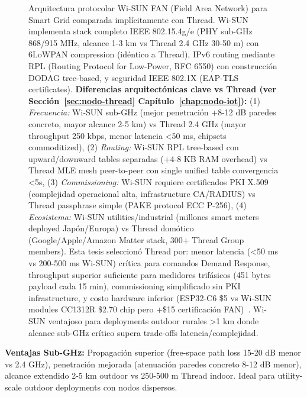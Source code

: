 \begin{figure}[H]
\centering
\caption{Arquitectura protocolar Wi-SUN FAN (Field Area Network) para Smart Grid comparada implícitamente con Thread. Wi-SUN implementa stack completo IEEE 802.15.4g/e (PHY sub-GHz 868/915 MHz, alcance 1-3 km vs Thread 2.4 GHz 30-50 m) con 6LoWPAN compression (idéntico a Thread), IPv6 routing mediante RPL (Routing Protocol for Low-Power, RFC 6550) con construcción DODAG tree-based, y seguridad IEEE 802.1X (EAP-TLS certificates). \textbf{Diferencias arquitectónicas clave vs Thread (ver Sección~\ref{sec:nodo-thread} Capítulo~\ref{chap:nodo-iot}):} (1) \textit{Frecuencia:} Wi-SUN sub-GHz (mejor penetración +8-12 dB paredes concreto, mayor alcance 2-5 km) vs Thread 2.4 GHz (mayor throughput 250 kbps, menor latencia <50 ms, chipsets commoditized), (2) \textit{Routing:} Wi-SUN RPL tree-based con upward/downward tables separadas (+4-8 KB RAM overhead) vs Thread MLE mesh peer-to-peer con single unified table convergencia <5s, (3) \textit{Commissioning:} Wi-SUN requiere certificados PKI X.509 (complejidad operacional alta, infrastructure CA/RADIUS) vs Thread passphrase simple (PAKE protocol ECC P-256), (4) \textit{Ecosistema:} Wi-SUN utilities/industrial (millones smart meters deployed Japón/Europa) vs Thread domótico (Google/Apple/Amazon Matter stack, 300+ Thread Group members). Esta tesis seleccionó Thread por: menor latencia (<50 ms vs 200-500 ms Wi-SUN) crítica para comandos Demand Response, throughput superior suficiente para medidores trifásicos (451 bytes payload cada 15 min), commissioning simplificado sin PKI infrastructure, y costo hardware inferior (ESP32-C6 \$5 vs Wi-SUN modules CC1312R \$2.70 chip pero +\$15 certificación FAN)~\cite{tiCC1312RWiSUN2024}. Wi-SUN ventajoso para deployments outdoor rurales >1 km donde alcance sub-GHz crítico supera trade-offs latencia/complejidad.}
\label{fig:wisun-protocol-stack}
\end{figure}

\textbf{Ventajas Sub-GHz:} Propagación superior (free-space path loss 15-20 dB menor vs 2.4 GHz), penetración mejorada (atenuación paredes concreto 8-12 dB menor), alcance extendido 2-5 km outdoor vs 250-500 m Thread indoor. Ideal para utility-scale outdoor deployments con nodos dispersos.

